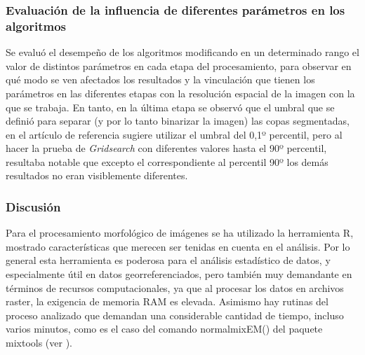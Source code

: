 

\subsubsection{Evaluación de la influencia de diferentes parámetros en los algoritmos}
Se evaluó el desempeño de los algoritmos modificando en un determinado rango el valor de distintos parámetros en cada etapa del procesamiento, para observar en qué modo se ven afectados los resultados y la vinculación que tienen los parámetros en las diferentes etapas con la resolución espacial de la imagen con la que se trabaja. En tanto, en la última etapa se observó que el umbral
que se definió para separar (y por lo tanto binarizar la imagen) las copas segmentadas, en el artículo de referencia sugiere utilizar el umbral del 0,1º percentil, pero al hacer la prueba de \textit{Gridsearch} con diferentes valores hasta el 90º percentil, resultaba notable que excepto el correspondiente al percentil 90º los demás resultados no eran visiblemente
diferentes.

\subsubsection{Discusión}
Para el procesamiento morfológico de imágenes se ha utilizado la herramienta R, mostrado características que merecen ser tenidas en cuenta en el análisis. Por lo general esta herramienta es poderosa para el análisis estadístico de datos, y especialmente útil en datos georreferenciados, pero también muy demandante en términos de recursos computacionales, ya que al procesar los datos en archivos raster, la exigencia de memoria RAM es elevada. Asimismo hay rutinas del proceso analizado que demandan una considerable cantidad de tiempo, incluso varios minutos, como es el caso del comando  normalmixEM() del paquete mixtools (ver \cite{young__aut_mixtools_2022}).



